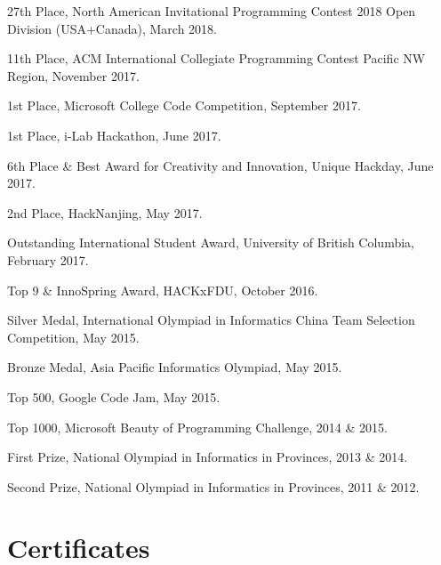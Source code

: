 \documentclass[letterpaper]{article}
\renewenvironment{itemize}{
  \begin{list}{}{
    \setlength{\leftmargin}{1.5em}
  }
}{
  \end{list}
}
\begin{document}
\begin{itemize}
  \item 27th Place, North American Invitational Programming Contest 2018 Open Division (USA+Canada), March 2018.

  \item 11th Place, ACM International Collegiate Programming Contest Pacific NW Region, November 2017.

  \item 1st Place, Microsoft College Code Competition, September 2017.

  \item 1st Place, i-Lab Hackathon, June 2017.

  \item 6th Place \& Best Award for Creativity and Innovation, Unique Hackday, June 2017.

  \item 2nd Place, HackNanjing, May 2017.

  \item Outstanding International Student Award, University of British Columbia, February 2017.

  \item Top 9 \& InnoSpring Award, HACKxFDU, October 2016.

  \item Silver Medal, International Olympiad in Informatics China Team Selection Competition, May 2015.

  \item Bronze Medal, Asia Pacific Informatics Olympiad, May 2015.

  \item Top 500, Google Code Jam, May 2015.

  \item Top 1000, Microsoft Beauty of Programming Challenge, 2014 \& 2015.

  \item First Prize, National Olympiad in Informatics in Provinces, 2013 \& 2014.

  \item Second Prize, National Olympiad in Informatics in Provinces, 2011 \& 2012.
\end{itemize}


\section*{Certificates}
\end{document}
